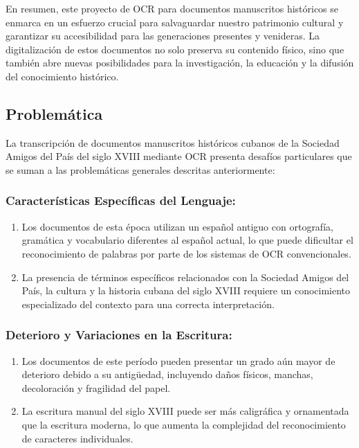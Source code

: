 \documentclass{article}
\begin{document}
En resumen, este proyecto de OCR para documentos manuscritos históricos se enmarca en un esfuerzo crucial para salvaguardar nuestro patrimonio cultural y garantizar su accesibilidad para las generaciones presentes y venideras. La digitalización de estos documentos no solo preserva su contenido físico, sino que también abre nuevas posibilidades para la investigación, la educación y la difusión del conocimiento histórico.

\newpage
\subsection{Problemática}

La transcripción de documentos manuscritos históricos cubanos de la Sociedad Amigos del País del siglo XVIII mediante OCR presenta desafíos particulares que se suman a las problemáticas generales descritas anteriormente:

\subsubsection{Características Específicas del Lenguaje:}
\begin{enumerate}
    \item Los documentos de esta época utilizan un español antiguo con ortografía, gramática y vocabulario diferentes al español actual, lo que puede dificultar el reconocimiento de palabras por parte de los sistemas de OCR convencionales.
    \item La presencia de términos específicos relacionados con la Sociedad Amigos del País, la cultura y la historia cubana del siglo XVIII requiere un conocimiento especializado del contexto para una correcta interpretación.
\end{enumerate}

\subsubsection{Deterioro y Variaciones en la Escritura:}
\begin{enumerate}
    \item Los documentos de este período pueden presentar un grado aún mayor de deterioro debido a su antigüedad, incluyendo daños físicos, manchas, decoloración y fragilidad del papel.
    \item La escritura manual del siglo XVIII puede ser más caligráfica y ornamentada que la escritura moderna, lo que aumenta la complejidad del reconocimiento de caracteres individuales.
\end{enumerate}
\end{document}
